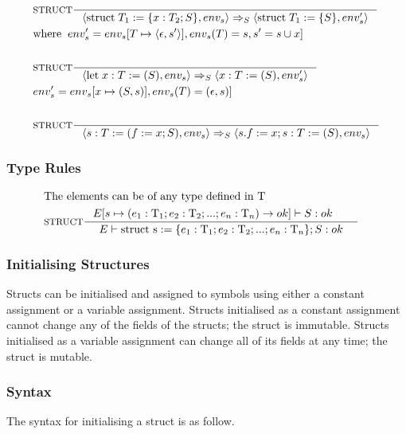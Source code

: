 \begin{align*}
&\inference[$\text{STRUCT}$]{}
                            {\Braket{\Tstruct T_1 := \{x:T_2;S\}, env_s} \Rightarrow_S \Braket{\Tstruct T_1 := \{S\},env_s'}}
\\
&{\Twhere env_s' = env_s[T \mapsto \Braket{\epsilon,s'}],env_s(T) = s,s' = s \cup x]}
\\\\
&\inference[$\text{STRUCT}$]{}
                            {\Braket{\Tlet \; x:T := (S),env_s} \Rightarrow_S \Braket{x:T := (S),env_s'}}
\\
&{env_s' = env_s[x \mapsto (S,s)],env_s(T) = (\epsilon,s)]}
\\\\
&\inference[$\text{STRUCT}$]{}
                            {\Braket{s:T := (f := x;S),env_s} \Rightarrow_S \Braket{s.f := x;s:T := (S),env_s}}
\end{align*}

\subsubsection{Type Rules}

\begin{align*}
\intertext{The elements can be of any type defined in $\Tt$}
&\inference[STRUCT]{E[s \mapsto (e_1:\Tt_1;e_2:\Tt_2;...;e_n:\Tt_n) \rightarrow ok]\vdash S : ok & }
                 {\Tenv \mathbin{\text{struct s}} := \{e_1:\Tt_1;e_2:\Tt_2;...;e_n:\Tt_n\}; S: ok}
\end{align*}



\subsubsection{Initialising Structures}
\label{sec:initStructures}

Structs can be initialised and assigned to symbols using either a constant assignment or a variable assignment. Structs initialised as a constant assignment cannot change any of the fields of the structs; the struct is immutable. Structs initialised as a variable assignment can change all of its fields at any time; the struct is mutable.

\subsubsection{Syntax}

The syntax for initialising a struct is as follow.

